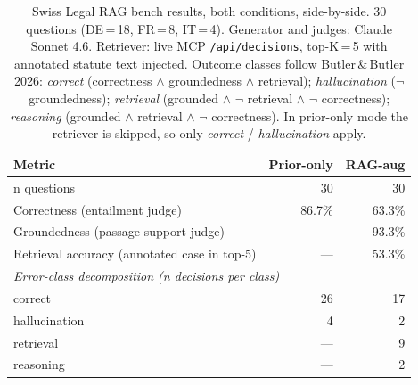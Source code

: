 \begin{table}[H]
\centering
\caption{Swiss Legal RAG bench results, both conditions, side-by-side. 30 questions (DE\,{=}\,18, FR\,{=}\,8, IT\,{=}\,4). Generator and judges: Claude Sonnet 4.6. Retriever: live MCP \texttt{/api/decisions}, top-K\,{=}\,5 with annotated statute text injected. Outcome classes follow Butler\,\&\,Butler 2026: \emph{correct} (correctness $\wedge$ groundedness $\wedge$ retrieval); \emph{hallucination} ($\neg$ groundedness); \emph{retrieval} (grounded $\wedge$ $\neg$ retrieval $\wedge$ $\neg$ correctness); \emph{reasoning} (grounded $\wedge$ retrieval $\wedge$ $\neg$ correctness). In prior-only mode the retriever is skipped, so only \emph{correct} / \emph{hallucination} apply.}
\label{tab:audit_bench_results}
\small
\begin{tabular}{l r r}
\toprule
\textbf{Metric} & \textbf{Prior-only} & \textbf{RAG-aug} \\
\midrule
n questions & 30 & 30 \\
Correctness (entailment judge) & 86.7\% & 63.3\% \\
Groundedness (passage-support judge) & --- & 93.3\% \\
Retrieval accuracy (annotated case in top-5) & --- & 53.3\% \\
\midrule
\multicolumn{3}{l}{\emph{Error-class decomposition (n decisions per class)}} \\
\quad correct          & 26 & 17 \\
\quad hallucination    & 4 & 2 \\
\quad retrieval        & ---           & 9 \\
\quad reasoning        & ---           & 2 \\
\bottomrule
\end{tabular}
\end{table}
